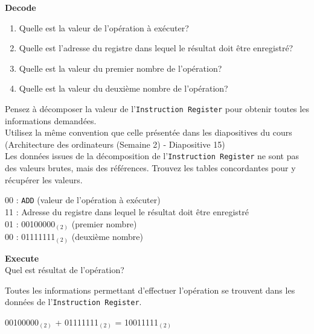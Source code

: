 \begin{Exercice}[5 minutes] \textbf{Decode}
    \begin{enumerate}
        \item Quelle est la valeur de l'opération à exécuter?
        \item Quelle est l'adresse du registre dans lequel le résultat doit être enregistré?
        \item Quelle est la valeur du premier nombre de l'opération?
        \item Quelle est la valeur du deuxième nombre de l'opération?
    \end{enumerate}
\end{Exercice}
   \begin{conseil}
    Pensez à décomposer la valeur de l’\lstinline{Instruction Register} pour obtenir toutes les informations demandées.\\
    Utilisez la même convention que celle présentée dans les diapositives du cours (Architecture des ordinateurs (Semaine 2) - Diapositive 15)\\
    Les données issues de la décomposition de l’\lstinline{Instruction Register} ne sont pas des valeurs brutes, mais des références. Trouvez les tables concordantes pour y récupérer les valeurs.

    \end{conseil}
\begin{solution}
    00 : \lstinline{ADD} (valeur de l'opération à exécuter)\\
    11 : Adresse du registre dans lequel le résultat doit être enregistré\\
    01 : 00100000$_{(2)}$ (premier nombre)\\
    00 : 01111111$_{(2)}$ (deuxième nombre)
\end{solution}

\begin{Exercice}[5 minutes] \textbf{Execute}\\
    Quel est résultat de l'opération?
\end{Exercice}

   \begin{conseil}
        Toutes les informations permettant d’effectuer l’opération se trouvent dans les données de l’\lstinline{Instruction Register}.
    \end{conseil}

\begin{solution}
    00100000$_{(2)}$ + 01111111$_{(2)}$ = 10011111$_{(2)}$
\end{solution}


